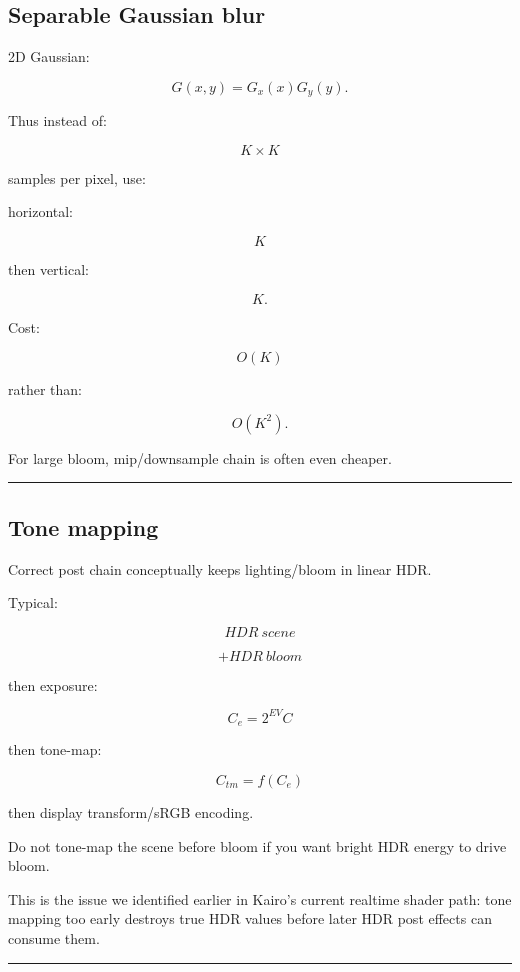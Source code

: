 \subsection{Separable Gaussian blur}\label{04-visual-computing-ii-ch040-separable-gaussian-blur}

2D Gaussian:

\[
G(x,y)
=
G_x(x)G_y(y).
\]

Thus instead of:

\[
K\times K
\]

samples per pixel, use:

horizontal:

\[
K
\]

then vertical:

\[
K.
\]

Cost:

\[
O(K)
\]

rather than:

\[
O(K^2).
\]

For large bloom, mip/downsample chain is often even cheaper.

\begin{center}\rule{0.5\linewidth}{0.5pt}\end{center}

\subsection{Tone mapping}\label{04-visual-computing-ii-ch040-tone-mapping}

Correct post chain conceptually keeps lighting/bloom in linear HDR.

Typical:

\[
HDR\ scene
\]

\[
+
HDR\ bloom
\]

then exposure:

\[
C_e=
2^{EV}C
\]

then tone-map:

\[
C_{tm}=f(C_e)
\]

then display transform/sRGB encoding.

Do not tone-map the scene before bloom if you want bright HDR energy to drive bloom.

This is the issue we identified earlier in Kairo's current realtime shader path: tone mapping too early destroys true HDR values before later HDR post effects can consume them.

\begin{center}\rule{0.5\linewidth}{0.5pt}\end{center}

